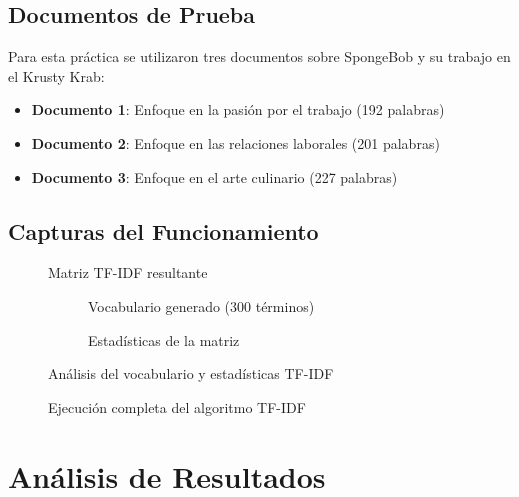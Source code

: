 \documentclass[12pt,a4paper]{article}
\begin{document}
\subsection{Documentos de Prueba}

Para esta práctica se utilizaron tres documentos sobre SpongeBob y su trabajo en el Krusty Krab:

\begin{itemize}
    \item \textbf{Documento 1}: Enfoque en la pasión por el trabajo (192 palabras)
    \item \textbf{Documento 2}: Enfoque en las relaciones laborales (201 palabras)
    \item \textbf{Documento 3}: Enfoque en el arte culinario (227 palabras)
\end{itemize}

\subsection{Capturas del Funcionamiento}

\begin{figure}[H]
    \centering
    
    \caption{Matriz TF-IDF resultante}
\end{figure}

\begin{figure}[H]
    \centering
    \begin{subfigure}{0.45\textwidth}
        
        \caption{Vocabulario generado (300 términos)}
    \end{subfigure}
    \hfill
    \begin{subfigure}{0.45\textwidth}
        
        \caption{Estadísticas de la matriz}
    \end{subfigure}
    \caption{Análisis del vocabulario y estadísticas TF-IDF}
\end{figure}

\begin{figure}[H]
    \centering
    
    \caption{Ejecución completa del algoritmo TF-IDF}
\end{figure}

\newpage

\section{Análisis de Resultados}
\end{document}

